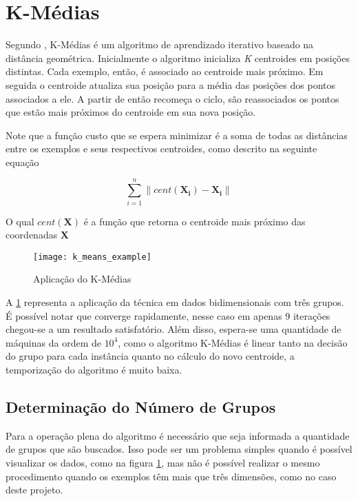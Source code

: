 \section{K-Médias}\label{sec:kmeans}

Segundo \citet{witten2011data}, K-Médias é um algoritmo de aprendizado iterativo baseado na distância geométrica. Inicialmente o algoritmo inicializa \textit{K} centroides em posições distintas. Cada exemplo, então, é associado ao centroide mais próximo. Em seguida o centroide atualiza sua posição para a média das posições dos pontos associados a ele. A partir de então recomeça o ciclo, são reassociados os pontos que estão mais próximos do centroide em sua nova posição.

Note que a função custo que se espera minimizar é a soma de todas as distâncias entre os exemplos e seus respectivos centroides, como descrito na seguinte equação

\[
\sum_{i=1}^{n} \lVert cent(\mathbf{X_{i}}) - \mathbf{X_{i}} \rVert
\]

O qual \(cent(\mathbf{X})\) é a função que retorna o centroide mais próximo das coordenadas \(\mathbf{X}\)

\begin{figure}
\texttt{[image: k\_means\_example]}
\caption[Aplicação do K-Médias]{Aplicação do K-Médias} \label{fig:k_means_example}
\end{figure}

A \ref{fig:k_means_example} representa a aplicação da técnica em dados bidimensionais com três grupos. É possível notar que converge rapidamente, nesse caso em apenas 9 iterações chegou-se a um resultado satisfatório. Além disso, espera-se uma quantidade de máquinas da ordem de \(10^4\), como o algoritmo K-Médias é linear tanto na decisão do grupo para cada instância quanto no cálculo do novo centroide, a temporização do algoritmo é muito baixa.

\subsection{Determinação do Número de Grupos}

Para a operação plena do algoritmo é necessário que seja informada a quantidade de grupos que são buscados. Isso pode ser um problema simples quando é possível visualizar os dados, como na figura \ref{fig:k_means_example}, mas não é possível realizar o mesmo procedimento quando os exemplos têm mais que três dimensões, como no caso deste projeto.


